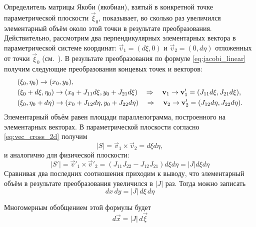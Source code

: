 Определитель матрицы Якоби (якобиан), взятый в конкретной точке параметрической плоскости $\vec\xi_0$, показывает,
во сколько раз увеличился элементарный объём около этой точки в результате преобразования.
Действительно, рассмотрим два перпендикулярных элементарных вектора
в параметрической системе координат: $\vec v_1 = (d\xi, 0)$ и $\vec v_2 = (0, d\eta)$
отложенных от точки $\vec\xi_0$ (см.~).
В результате преобразования по формуле \cref{eq:jacobi_linear} 
получим следующие преобразования концевых точек и векторов:
\begin{align*}
& (\xi_0, \eta_0) \to (x_0, y_0), \\
& (\xi_0 + d\xi, \eta_0) \to (x_0 + J_{11} d\xi, y_0 + J_{21} d\xi) \quad\Rightarrow\quad \boldsymbol{\rm v}_1 \to \boldsymbol{\rm v}'_1 = (J_{11} d\xi, J_{21} d\xi), \\
& (\xi_0 , \eta_0 + d\eta) \to (x_0 + J_{12} d\eta, y_0 + J_{22} d\eta) \quad\Rightarrow\quad \boldsymbol{\rm v}_2 \to \boldsymbol{\rm v}'_2 = (J_{12} d\eta, J_{22} d\eta).
\end{align*}
Элементарный объём равен площади параллелограмма, построенного
на элементарных векторах.
В параметрической плоскости согласно \cref{eq:vec_cross_2d} получим 
$$ |S| = \vec v_1 \times \vec v_2 = d\xi d\eta,$$
и аналогично для физической плоскости:
$$
|S'| = \vec v'_1 \times \vec v'_2 = (J_{11} J_{22} - J_{12} J_{21})d\xi d\eta = |J| d\xi d\eta
$$
Сравнивая два последних соотношения приходим к выводу,
что элементарный объём в результате преобразования увеличился в $|J|$ раз. Тогда можно записать
\begin{equation}
\label{eq:dxdy_dxideta}
dx\,dy = |J|\,d\xi\,d\eta
\end{equation}

Многомерным обобщением этой формулы будет
\begin{equation}
\label{eq:vec_dx_dxi}
d\vec x = |J|\,d\vec \xi
\end{equation}

